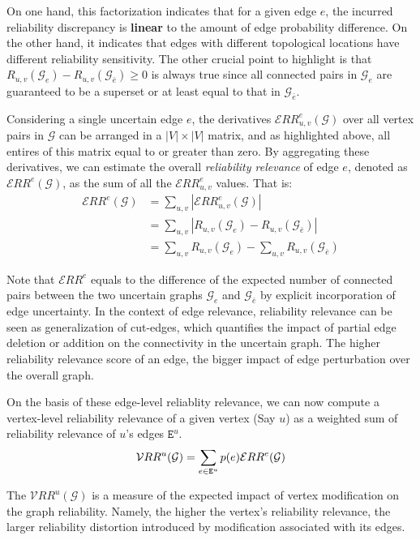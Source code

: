 On one hand, this factorization indicates that for a given edge $e$,  the incurred reliability discrepancy is {\bf linear} to the amount of edge probability difference. 
On the other hand, it indicates that edges with different topological locations have different reliability sensitivity. 
The other crucial point to highlight is that $R_{u,v}(\mathcal{G}_{e}) - R_{u,v} (\mathcal{G}_{\bar{e}}) \ge 0$ is always true since 
all connected pairs in $\mathcal{G}_{e}$ are guaranteed to be a superset or at least equal to that in $\mathcal{G}_{\bar{e}}$.

Considering a single uncertain edge $e$, the derivatives $\mathcal{E}RR^e_{u,v}(\mathcal{G})$ over all 
vertex pairs in $\mathcal{G}$ can be arranged in a $|V|\times |V|$ matrix, and as highlighted above, 
all entires of this matrix equal to or greater than zero.  
By aggregating these derivatives, we can estimate the overall {\em reliability relevance} of edge $e$, denoted as
$\mathcal{E}RR^{e}(\mathcal{G})$, as the sum of all the $\mathcal{E}RR^{e}_{u,v}$ values. That is:
\begin{align*}
    \mathcal{E}RR^e(\mathcal{G}) &= \sum_{u,v} |\mathcal{E}RR^e_{u,v}(\mathcal{G})| \\
          &= \sum_{u,v} |R_{u,v}(\mathcal{G}_{e}) -R_{u,v}(\mathcal{G}_{\bar{e}})| \\  
         &= \sum_{u,v} R_{u,v} (\mathcal{G}_{e}) - \sum_{u,v} R_{u,v}(\mathcal{G}_{\bar{e}}) 
\end{align*}

Note that $\mathcal{E}RR^e$ equals to the difference of the expected number of 
connected pairs between the two uncertain graphs $\mathcal{G}_{e}$ and $\mathcal{G}_{\bar{e}}$
 by explicit incorporation of edge uncertainty.  
 In the context of edge relevance, reliability relevance can be seen as generalization of cut-edges, 
 which quantifies the impact of partial edge deletion or addition on the connectivity in the uncertain graph. 
The higher reliability relevance score of an edge, the bigger impact of edge perturbation over the overall graph.  

On the basis of these edge-level reliablity relevance, we can now compute a vertex-level reliability relevance of a given vertex (Say $u$) as a weighted sum of reliability relevance of $u$'s edges $\mathtt{E}^{u}$.  
\begin{equation*}
    \vspace{-0.5em}
    \mathcal{V}RR^{u}(\mathcal{G})=\sum_{e \in \mathtt{E}^{u}} p(e)  \mathcal{E}RR^{e}(\mathcal{G})
    \vspace{0.5em}
\end{equation*}

The $\mathcal{V}RR^{u}(\mathcal{G})$  is a measure of the expected impact of vertex modification on the graph reliability. Namely, the higher the vertex's reliability relevance, the larger reliability distortion introduced by modification associated with its edges.

